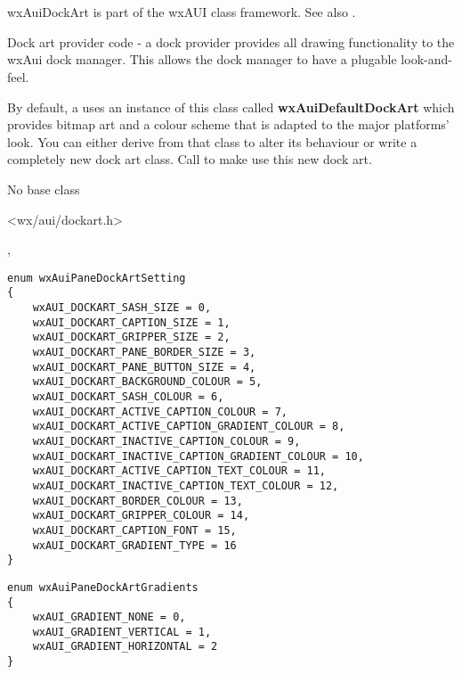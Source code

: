 %
%

\section{}\label{wxauidockart}

wxAuiDockArt is part of the wxAUI class framework.
See also .

Dock art provider code - a dock provider provides all drawing
functionality to the wxAui dock manager. This allows the dock
manager to have a plugable look-and-feel.

By default, a  uses an
instance of this class called {\bf wxAuiDefaultDockArt} which
provides bitmap art and a colour scheme that is adapted to
the major platforms' look. You can either derive from that
class to alter its behaviour or write a completely new dock
art class. Call 
to make use this new dock art.


No base class


<wx/aui/dockart.h>


, 


\begin{verbatim}
enum wxAuiPaneDockArtSetting
{
    wxAUI_DOCKART_SASH_SIZE = 0,
    wxAUI_DOCKART_CAPTION_SIZE = 1,
    wxAUI_DOCKART_GRIPPER_SIZE = 2,
    wxAUI_DOCKART_PANE_BORDER_SIZE = 3,
    wxAUI_DOCKART_PANE_BUTTON_SIZE = 4,
    wxAUI_DOCKART_BACKGROUND_COLOUR = 5,
    wxAUI_DOCKART_SASH_COLOUR = 6,
    wxAUI_DOCKART_ACTIVE_CAPTION_COLOUR = 7,
    wxAUI_DOCKART_ACTIVE_CAPTION_GRADIENT_COLOUR = 8,
    wxAUI_DOCKART_INACTIVE_CAPTION_COLOUR = 9,
    wxAUI_DOCKART_INACTIVE_CAPTION_GRADIENT_COLOUR = 10,
    wxAUI_DOCKART_ACTIVE_CAPTION_TEXT_COLOUR = 11,
    wxAUI_DOCKART_INACTIVE_CAPTION_TEXT_COLOUR = 12,
    wxAUI_DOCKART_BORDER_COLOUR = 13,
    wxAUI_DOCKART_GRIPPER_COLOUR = 14,
    wxAUI_DOCKART_CAPTION_FONT = 15,
    wxAUI_DOCKART_GRADIENT_TYPE = 16
}
\end{verbatim}

\begin{verbatim}
enum wxAuiPaneDockArtGradients
{
    wxAUI_GRADIENT_NONE = 0,
    wxAUI_GRADIENT_VERTICAL = 1,
    wxAUI_GRADIENT_HORIZONTAL = 2
}
\end{verbatim}

